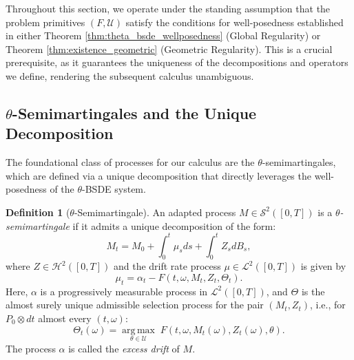 \documentclass[12pt, letterpaper]{amsart}
\newcommand{\Ucal}{\mathcal{U}}
\newcommand{\Scalp}[1]{\mathcal{S}^{#1}}
\newcommand{\Hcalp}[1]{\mathcal{H}^{#1}}
\newcommand{\Lcalp}[1]{\mathcal{L}^{#1}}
\DeclareMathOperator*{\argmax}{arg\,max}
\theoremstyle{plain}
\theoremstyle{definition}
\newtheorem{definition}[theorem]{Definition}
\theoremstyle{remark}
\numberwithin{equation}{section} %
\begin{document}
Throughout this section, we operate under the standing assumption that the problem primitives \((F, \Ucal)\) satisfy the conditions for well-posedness established in either Theorem \ref{thm:theta_bsde_wellposedness} (Global Regularity) or Theorem \ref{thm:existence_geometric} (Geometric Regularity). This is a crucial prerequisite, as it guarantees the uniqueness of the decompositions and operators we define, rendering the subsequent calculus unambiguous.

\subsection{\texorpdfstring{$\theta$}{theta}-Semimartingales and the Unique Decomposition}
The foundational class of processes for our calculus are the \(\theta\)-semimartingales, which are defined via a unique decomposition that directly leverages the well-posedness of the \(\theta\)-BSDE system.

\begin{definition}[$\theta$-Semimartingale]
\label{def:theta_semimartingale}
An adapted process \(M \in \Scalp{2}([0,T])\) is a \emph{\(\theta\)-semimartingale} if it admits a unique decomposition of the form:
\begin{equation}\label{eq:semimartingale_decomposition}
    M_t = M_0 + \int_0^t \mu_s ds + \int_0^t Z_s dB_s,
\end{equation}
where \(Z \in \Hcalp{2}([0,T])\) and the drift rate process \(\mu \in \Lcalp{2}([0,T])\) is given by
\begin{equation} \label{eq:drift_decomposition}
    \mu_t = \alpha_t - F(t, \omega, M_t, Z_t, \Theta_t).
\end{equation}
Here, \(\alpha\) is a progressively measurable process in \(\Lcalp{2}([0,T])\), and \(\Theta\) is the almost surely unique admissible selection process for the pair \((M_t,Z_t)\), i.e., for \(P_0 \otimes dt\) almost every \((t,\omega)\):
\[
    \Theta_t(\omega) = \underset{\theta \in \Ucal}{\argmax} \; F(t, \omega, M_t(\omega), Z_t(\omega), \theta).
\]
The process \(\alpha\) is called the \emph{excess drift} of \(M\).
\end{definition}
\end{document}
